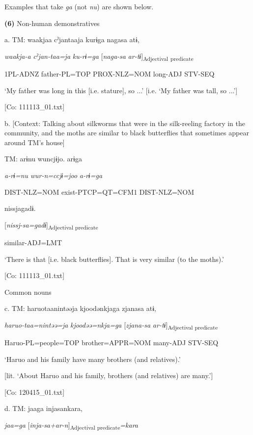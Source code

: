 Examples that take \textit{ga} (not \textit{nu}) are shown below.

\textbf{(6)}  Non-human demonstratives

  a.  TM:  waakjaa  cˀjantaaja  kurɨga  nagasa  atɨ,

      \textit{waakja-a}  \textit{cˀjan-taa=ja}  \textit{ku-rɨ=ga}  [\textit{naga-sa}  \textit{ar-tɨ}]\textsubscript{Adjectival} \textsubscript{predicate}

      1PL-ADNZ  father{}-PL=TOP  PROX-NLZ=NOM  long{}-ADJ  STV-SEQ

      ‘My father was long in this [i.e. stature], so ...’ [i.e. ‘My father was tall, so ...’]

      [Co: 111113\_01.txt]

  b.  [Context: Talking about silkworms that were in the silk-reeling factory in the community, and the moths are similar to black butterflies that sometimes appear around TM’s house]

    TM:  arɨnu  wuncjɨjo.  arɨga

      \textit{a-rɨ=nu}  \textit{wur-n=ccjɨ=joo}  \textit{a-rɨ=ga}

      DIST-NLZ=NOM  exist-PTCP=QT=CFM1  DIST-NLZ=NOM

      nissjagadɨ.

      [\textit{nissj-sa=gadɨ}]\textsubscript{Adjectival predicate}

      similar-ADJ=LMT

      ‘There is that [i.e. black butterflies]. That is very similar (to the moths).’

      [Co: 111113\_01.txt]

  Common nouns

  c.  TM:  haruotaanintəəja  kjoodənkjaga  zjanasa  atɨ,

      \textit{haruo-taa=nintəə=ja}  \textit{kjoodəə=nkja=ga}  [\textit{zjana-sa}  \textit{ar-tɨ}]\textsubscript{Adjectival predicate}

      Haruo-PL=people=TOP  brother=APPR=NOM  many-ADJ  STV-SEQ

      ‘Haruo and his family have many brothers (and relatives).’ 

[lit. ‘About Haruo and his family, brothers (and relatives) are many.’]

      [Co: 120415\_01.txt]

  d.  TM:  jaaga  injasankara,

      \textit{jaa=ga}  [\textit{inja-sa+ar-n}]\textsubscript{Adjectival predicate}\textit{=kara}

